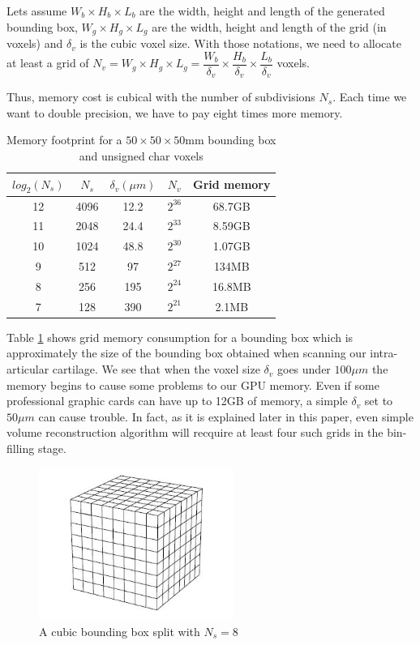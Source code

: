 \documentclass[12pt,journal,compsoc]{IEEEtran}
\begin{document}
Lets assume $W_b\times H_b\times L_b$ are the width, height and length of the generated bounding box, $W_g\times H_g\times L_g$ are the width, height and length of the grid (in voxels) and $\delta_v$ is the cubic voxel size. With those notations, we need to allocate at least a grid of $N_v = W_g\times H_g\times L_g =  \dfrac{W_b}{\delta_v}\times \dfrac{H_b}{\delta_v}\times \dfrac{L_b}{\delta_v}$ voxels. \par

\vspace{0.2cm}
Thus, memory cost is cubical with the number of subdivisions $N_s$. Each time we want to double precision, we have to pay eight times more memory.

\begin{table}[!t]
\renewcommand{\arraystretch}{1.3}
\caption{Memory footprint for a $50\times 50\times 50$mm bounding box and unsigned char voxels}
\label{memory_table}
\centering
\begin{tabular}{|c|c||c|c||c|}
\hline
$log_2(N_s)$ & $N_s$ & $\delta_v (\mu m)$ & $N_v$ & Grid memory \\
\hline
12 & 4096 & 12.2 & $2^{36}$ & 68.7GB\\\hline
11 & 2048 & 24.4 & $2^{33}$ & 8.59GB\\\hline
10 & 1024 & 48.8 & $2^{30}$ & 1.07GB\\\hline
9 & 512 & 97 & $2^{27}$ & 134MB\\\hline
8 & 256 & 195 & $2^{24}$ & 16.8MB\\\hline
7 & 128 & 390 & $2^{21}$ & 2.1MB\\\hline
\end{tabular}
\end{table}
Table \ref{memory_table} shows grid memory consumption for a bounding box which is approximately the size of the bounding box obtained when scanning our intra-articular cartilage.
We see that when the voxel size $\delta_v$ goes under $100\mu m$ the memory begins to cause some problems to our GPU memory.
Even if some professional graphic cards can have up to 12GB of memory, a simple $\delta_v$ set to $50\mu m$ can cause trouble.
In fact, as it is explained later in this paper, even simple volume reconstruction algorithm will recquire at least four such grids in the bin-filling stage.

\begin{figure}[!h]
\centering
\includegraphics[width=2.5in]{grid}
\caption{A cubic bounding box split with $N_s=8$}
\label{grid}
\end{figure}
\end{document}
